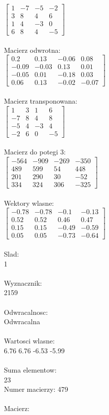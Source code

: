 \documentclass[a4paper,12pt]{article}
\begin{document}
$\begin{bmatrix} 1&-7&-5&-2\\3&8&4&6\\1&4&-3&0\\6&8&4&-5 \end{bmatrix}$
\\
\\
Macierz odwrotna:\\

$\begin{bmatrix} 0.2&0.13&-0.06&0.08\\-0.09&-0.03&0.13&0.01\\-0.05&0.01&-0.18&0.03\\0.06&0.13&-0.02&-0.07 \end{bmatrix}$
\\
\\
Macierz transponowana:\\

$\begin{bmatrix} 1&3&1&6\\-7&8&4&8\\-5&4&-3&4\\-2&6&0&-5 \end{bmatrix}$
\\
\\
Macierz do potegi 3:\\

$\begin{bmatrix} -564&-909&-269&-350\\489&599&54&448\\201&290&30&-52\\334&324&306&-325 \end{bmatrix}$
\\
\\
Wektory wlasne:\\

$\begin{bmatrix} -0.78&-0.78&-0.1&-0.13\\0.52&0.52&0.46&0.47\\0.15&0.15&-0.49&-0.59\\0.05&0.05&-0.73&-0.64 \end{bmatrix}$
\\
\\
Slad:\\
1
\\
\\
Wyznacznik:\\
2159
\\
\\
Odwracalnosc:\\
Odwracalna
\\
\\
Wartosci wlasne:\\
6.76 6.76 -6.53 -5.99
\\
\\
Suma elementow:\\
23
\\
\newpage
Numer macierzy:
479
\\
\\
Macierz:\\
\end{document}
